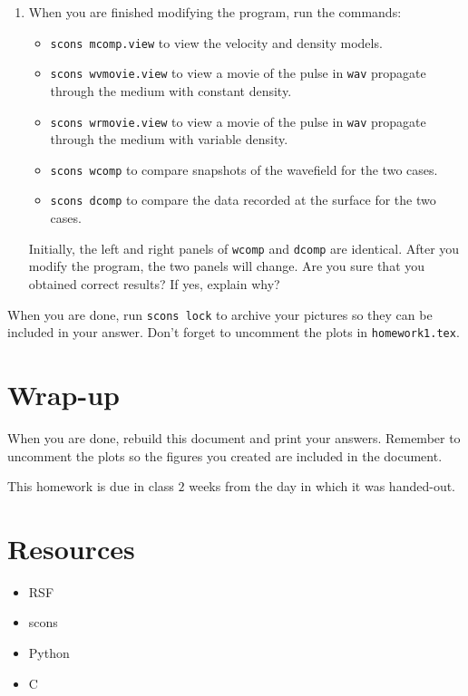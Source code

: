 \begin{enumerate}
\item
When you are finished modifying the program, run the commands:

\begin{itemize}

\item \texttt{scons mcomp.view} to view the velocity and density models.

\item \texttt{scons wvmovie.view} to view a movie of the pulse in
\texttt{wav} propagate through the medium with constant density.

\item \texttt{scons wrmovie.view} to view a movie of the pulse in
\texttt{wav} propagate through the medium with variable density.

\item \texttt{scons wcomp} to compare snapshots of the wavefield
for the two cases.

\item \texttt{scons dcomp} to compare the data recorded at the surface
for the two cases.

\end{itemize}

Initially, the left and right panels of \texttt{wcomp} and 
\texttt{dcomp} are identical. After you modify the program, the 
two panels will change. Are you sure that you obtained correct 
results? If yes, explain why?

\end{enumerate}

When you are done, run \texttt{scons lock} to archive your pictures 
so they can be included in your answer.
Don't forget to uncomment the plots in \texttt{homework1.tex}.



\section{Wrap-up}

When you are done, rebuild this document and 
print your answers. Remember to uncomment the plots
so the figures you created are included in the document.

This homework is due in class $2$ weeks
from the day in which it was handed-out.


\section{Resources}

\begin{itemize}
\item RSF
\item scons
\item Python
\item C
\end{itemize}
